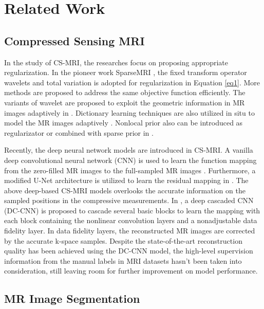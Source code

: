 \documentclass[runningheads]{llncs}
\begin{document}
\section{Related Work}
\label{ReWo}

\subsection{Compressed Sensing MRI}
\label{CSMRI}

In the study of CS-MRI, the researches focus on proposing appropriate regularization. In the pioneer work SparseMRI \cite{3}, the fixed transform operator wavelets and total variation is adopted for regularization in Equation \ref{eq1}. More methods \cite{6,7,8} are proposed to address the same objective function efficiently. The variants of wavelet are proposed to exploit the geometric information in MR images adaptively in \cite{9,10,11}. Dictionary learning techniques are also utilized in situ to model the MR images adaptively \cite{5,12,13}. Nonlocal prior also can be introduced as regularizator \cite{14} or combined with sparse prior in \cite{10}.

Recently, the deep neural network models are introduced in CS-MRI. A vanilla deep convolutional neural network (CNN) is used to learn the function mapping from the zero-filled MR images to the full-sampled MR images \cite{15}. Furthermore, a modified U-Net architecture is utilized to learn the residual mapping in \cite{17}. The above deep-based CS-MRI models overlooks the accurate information on the sampled positions in the compressive measurements. In \cite{4}, a deep cascaded CNN (DC-CNN) is proposed to cascade several basic blocks to learn the mapping with each block containing the nonlinear convolution layers and a nonadjustable data fidelity layer. In data fidelity layers, the reconstructed MR images are corrected by the accurate k-space samples. Despite the state-of-the-art reconstruction quality has been achieved using the DC-CNN model, the high-level supervision information from the manual labels in MRI datasets hasn't been taken into consideration, still leaving room for further improvement on model performance.

\subsection{MR Image Segmentation}
\label{MRIS}
\end{document}
